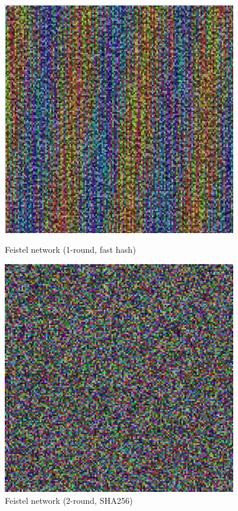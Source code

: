 \documentclass[
    parspace,
    noindent,
    nohyp,
]{elteiktdk}[2023/04/10]
\begin{document}
\begin{figure}[H]
  \hspace*{\fill}
  \begin{minipage}[b]{0.45\textwidth}
    \centering
    \includegraphics[width=0.9\textwidth]{image/permutation-feif1.png}
    \caption{Feistel network (1-round, fast hash)}
  \end{minipage}
  \hspace*{\fill}
  \begin{minipage}[b]{0.45\textwidth}
    \centering
    \includegraphics[width=0.9\textwidth]{image/permutation-feis2.png}
    \caption{Feistel network (2-round, SHA256)}
  \end{minipage}
  \hspace*{\fill}
\end{figure}
\end{document}
